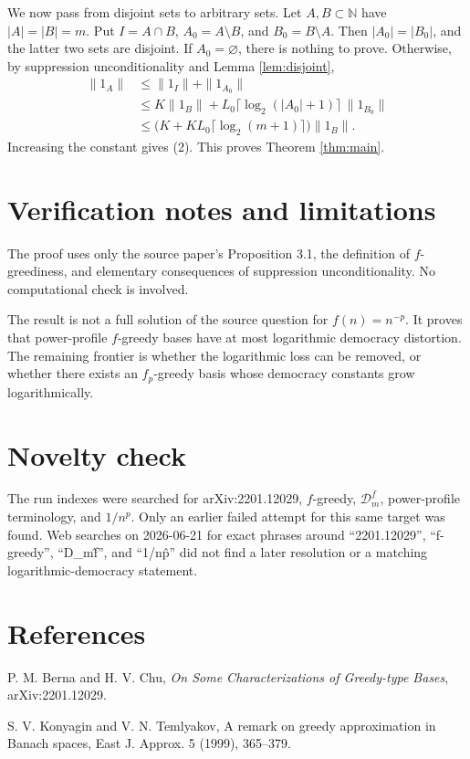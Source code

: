 \documentclass[11pt]{article}
\theoremstyle{definition}
\newcommand{\N}{\mathbb N}
\newcommand{\calD}{\mathcal D}
\newcommand{\fp}{f_p}
\begin{document}
We now pass from disjoint sets to arbitrary sets.  Let \(A,B\subset\N\) have
\(|A|=|B|=m\).  Put \(I=A\cap B\), \(A_0=A\setminus B\), and
\(B_0=B\setminus A\).  Then \(|A_0|=|B_0|\), and the latter two sets are
disjoint.  If \(A_0=\varnothing\), there is nothing to prove.  Otherwise, by
suppression unconditionality and Lemma \ref{lem:disjoint},
\[
\begin{aligned}
        \|1_A\|
        &\le \|1_I\|+\|1_{A_0}\|  \\
        &\le K\|1_B\|
          + L_0\lceil\log_2(|A_0|+1)\rceil\,\|1_{B_0}\| \\
        &\le \bigl(K+K L_0\lceil\log_2(m+1)\rceil\bigr)\|1_B\|.
\end{aligned}
\]
Increasing the constant gives (2).  This proves Theorem \ref{thm:main}.

\section*{Verification notes and limitations}

The proof uses only the source paper's Proposition 3.1, the definition of
\(f\)-greediness, and elementary consequences of suppression unconditionality.
No computational check is involved.

The result is not a full solution of the source question for \(f(n)=n^{-p}\).
It proves that power-profile \(f\)-greedy bases have at most logarithmic
democracy distortion.  The remaining frontier is whether the logarithmic loss
can be removed, or whether there exists an \(\fp\)-greedy basis whose democracy
constants grow logarithmically.

\section*{Novelty check}

The run indexes were searched for arXiv:2201.12029, \(f\)-greedy,
\(\calD_m^f\), power-profile terminology, and \(1/n^p\).  Only an earlier
failed attempt for this same target was found.  Web searches on 2026-06-21 for
exact phrases around ``2201.12029'', ``f-greedy'', ``D\_m\^f'', and
``1/n\^p'' did not find a later resolution or a matching logarithmic-democracy
statement.

\section*{References}

\begin{enumerate}[label={[\arabic*]}]
\item P. M. Berna and H. V. Chu,
      \emph{On Some Characterizations of Greedy-type Bases},
      arXiv:2201.12029.
\item S. V. Konyagin and V. N. Temlyakov,
      A remark on greedy approximation in Banach spaces,
      East J. Approx. 5 (1999), 365--379.
\end{enumerate}
\end{document}
